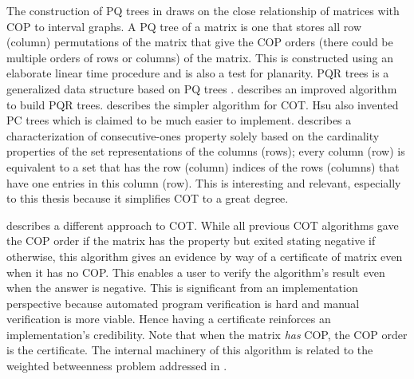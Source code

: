 \documentclass[MS]             %
              {iitmdiss_as}    %
\begin{document}
The construction of PQ trees in \cite{bl76} draws on the
close relationship of matrices with COP to interval graphs. A PQ tree of a
matrix is one that stores all row (column) permutations of the matrix
that give the COP orders (there could be multiple orders of rows or columns) of the matrix. This
is constructed using an elaborate linear time procedure and is also
a test for planarity. %
PQR trees is a generalized data structure based on PQ trees
\cite{mm96,mpt98}.  \cite{tm05} describes an improved algorithm to
build PQR trees. \cite{wlh02}
describes the simpler algorithm for COT. Hsu also invented PC trees
\cite{wlh01}
which is claimed to be much easier to implement. \cite{nsnrs09}
describes a characterization of consecutive-ones property solely based
on the cardinality properties of the set representations of the
columns (rows); every column (row) is equivalent to a set that has the
row (column) indices of the rows (columns) that have one entries in
this column (row). This is interesting and relevant, especially to
this thesis because it simplifies COT to a great
degree. 

\cite{mcc04} describes a different approach to COT. While all previous
COT algorithms gave the COP order if the matrix has the property but
exited stating negative if otherwise, this algorithm gives an evidence
by way of a certificate of matrix even when it has no COP. This
enables a user to verify the algorithm's result even when the answer
is negative. This is significant from an implementation perspective
because automated program verification is hard and manual verification
is more viable. Hence having a certificate reinforces an
implementation's credibility. Note that when the matrix {\em has} COP,
the COP order is the certificate.  The internal machinery of this
algorithm is related to the weighted betweenness problem
addressed in \cite{co98}.  
\end{document}
